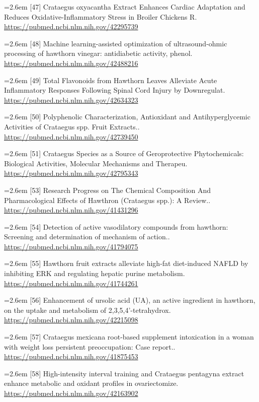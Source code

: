 \documentclass[11pt]{article}
\begin{document}
{\noindent\hangindent=2.6em [47] Crataegus oxyacantha Extract Enhances Cardiac Adaptation and Reduces Oxidative-Inflammatory Stress in Broiler Chickens R. \url{https://pubmed.ncbi.nlm.nih.gov/42295739}\par
\noindent\hangindent=2.6em [48] Machine learning-assisted optimization of ultrasound-ohmic processing of hawthorn vinegar: antidiabetic activity, phenol. \url{https://pubmed.ncbi.nlm.nih.gov/42488216}\par
\noindent\hangindent=2.6em [49] Total Flavonoids from Hawthorn Leaves Alleviate Acute Inflammatory Responses Following Spinal Cord Injury by Downregulat. \url{https://pubmed.ncbi.nlm.nih.gov/42634323}\par
\noindent\hangindent=2.6em [50] Polyphenolic Characterization, Antioxidant and Antihyperglycemic Activities of Crataegus spp. Fruit Extracts.. \url{https://pubmed.ncbi.nlm.nih.gov/42739450}\par
\noindent\hangindent=2.6em [51] Crataegus Species as a Source of Geroprotective Phytochemicals: Biological Activities, Molecular Mechanisms and Therapeu. \url{https://pubmed.ncbi.nlm.nih.gov/42795343}\par
\noindent\hangindent=2.6em [53] Research Progress on The Chemical Composition And Pharmacological Effects of Hawthron (Crataegus spp.): A Review.. \url{https://pubmed.ncbi.nlm.nih.gov/41431296}\par
\noindent\hangindent=2.6em [54] Detection of active vasodilatory compounds from hawthorn: Screening and determination of mechanism of action.. \url{https://pubmed.ncbi.nlm.nih.gov/41794075}\par
\noindent\hangindent=2.6em [55] Hawthorn fruit extracts alleviate high-fat diet-induced NAFLD by inhibiting ERK and regulating hepatic purine metabolism. \url{https://pubmed.ncbi.nlm.nih.gov/41744261}\par
\noindent\hangindent=2.6em [56] Enhancement of ursolic acid (UA), an active ingredient in hawthorn, on the uptake and metabolism of 2,3,5,4'-tetrahydrox. \url{https://pubmed.ncbi.nlm.nih.gov/42215098}\par
\noindent\hangindent=2.6em [57] Crataegus mexicana root-based supplement intoxication in a woman with weight loss persistent preoccupation: Case report.. \url{https://pubmed.ncbi.nlm.nih.gov/41875453}\par
\noindent\hangindent=2.6em [58] High-intensity interval training and Crataegus pentagyna extract enhance metabolic and oxidant profiles in ovariectomize. \url{https://pubmed.ncbi.nlm.nih.gov/42163902}\par
}
\end{document}
